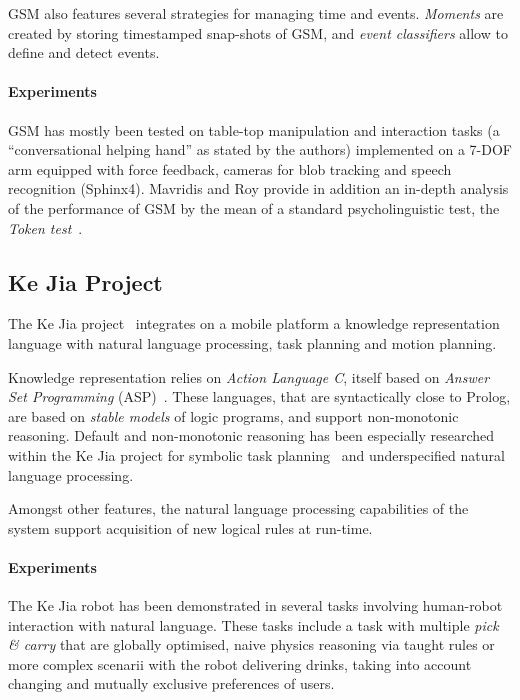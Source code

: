 \documentclass[journal]{IEEEtran}
\begin{document}
GSM also features several strategies for managing time and events.
\emph{Moments} are created by storing timestamped snap-shots of GSM, and
\emph{event classifiers} allow to define and detect events.

\paragraph{Experiments} GSM has mostly been tested on table-top manipulation
and interaction tasks (a ``conversational helping hand'' as stated by the
authors) implemented on a 7-DOF arm equipped with force feedback, cameras for blob
tracking and speech recognition (Sphinx4). Mavridis and Roy provide in addition
an in-depth analysis of the performance of GSM by the mean of a standard
psycholinguistic test, the \emph{Token test}~\cite{DiSimoni1978}.

\subsection{Ke Jia Project}
\label{sect|kejia}

The Ke Jia project~\cite{Chen2010} integrates on a mobile platform a knowledge
representation language with natural language processing, task planning and
motion planning.

Knowledge representation relies on \emph{Action Language C}, itself based on
\emph{Answer Set Programming} (ASP)~\cite{Gelfond2008}. These languages, that
are syntactically close to Prolog, are based on \emph{stable models} of logic
programs, and support non-monotonic reasoning. Default and non-monotonic
reasoning has been especially researched within the Ke Jia project for symbolic
task planning~\cite{Ji2011} and underspecified natural language processing.

Amongst other features, the natural language processing capabilities of the
system support acquisition of new logical rules at run-time.

\paragraph{Experiments} The Ke Jia robot has been demonstrated in several tasks
involving human-robot interaction with natural language. These tasks include a
task with multiple \emph{pick \& carry} that are globally optimised, naive
physics reasoning via taught rules or more complex scenarii with the robot
delivering drinks, taking into account changing and mutually exclusive
preferences of users.
\end{document}
